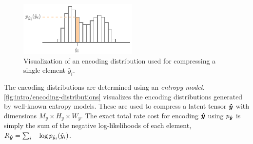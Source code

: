\begin{figure}[htbp]
  \centering
  \includegraphics[width=0.8\linewidth]{img/introduction/encoding-distribution.pdf}
  \caption[Visualization of an encoding distribution for a single element]{%
    Visualization of an encoding distribution used for compressing a single element $\hat{y}_i$.%
  }
  \label{fig:intro/encoding-distribution}
\end{figure}


The encoding distributions are determined using an \emph{entropy model}.
\cref{fig:intro/encoding-distributions} visualizes the encoding distributions generated by well-known entropy models.
These are used to compress a latent tensor ${\boldsymbol{\hat{y}}}$ with dimensions $M_y \times H_y \times W_y$.
The exact total rate cost for encoding ${\boldsymbol{\hat{y}}}$ using $p_{{\boldsymbol{\hat{y}}}}$ is simply the sum of the negative log-likelihoods of each element, $R_{{\boldsymbol{\hat{y}}}} = \sum_i -\log p_{{\hat{y}}_i}({\hat{y}}_i)$.


